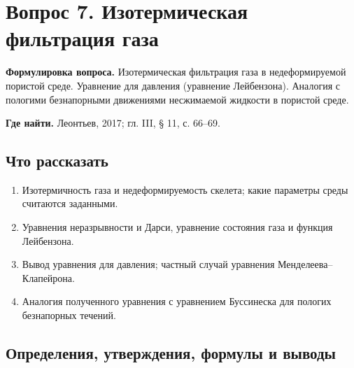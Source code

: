 \documentclass[12pt,a4paper]{article}
\newcounter{questionnumber}
\begin{document}
\clearpage
\setcounter{questionnumber}{7}
\setcounter{equation}{0}
\setcounter{footnote}{0}
\section*{Вопрос 7. Изотермическая фильтрация газа}
\textbf{Формулировка вопроса.} Изотермическая фильтрация газа в недеформируемой пористой среде. Уравнение для давления (уравнение Лейбензона). Аналогия с пологими безнапорными движениями несжимаемой жидкости в пористой среде.

\medskip
\textbf{Где найти.} Леонтьев, 2017; гл. III, § 11, с. 66--69.

\subsection*{Что рассказать}
\begin{enumerate}
\item Изотермичность газа и недеформируемость скелета; какие параметры среды считаются заданными.
\item Уравнения неразрывности и Дарси, уравнение состояния газа и функция Лейбензона.
\item Вывод уравнения для давления; частный случай уравнения Менделеева--Клапейрона.
\item Аналогия полученного уравнения с уравнением Буссинеска для пологих безнапорных течений.
\end{enumerate}
\subsection*{Определения, утверждения, формулы и выводы}
\begingroup
\end{document}
